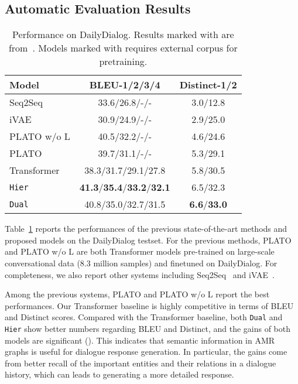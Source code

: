 \documentclass[11pt,a4paper]{article}
\begin{document}
\subsection{Automatic Evaluation Results}
\begin{table}
	\centering
	\small
	\begin{tabular}{lcc}
		\toprule
		\textbf{Model}&BLEU-1/2/3/4 &Distinct-1/2 \\
		\midrule
		Seq2Seq &33.6/26.8/-/- &3.0/12.8   \\
		iVAE &30.9/24.9/-/- &2.9/25.0  \\
		PLATO w/o L &40.5/32.2/-/- &4.6/24.6 \\
		PLATO &39.7/31.1/-/- &5.3/29.1 \\
		\midrule
		\rowcolor{mygray}
		Transformer &38.3/31.7/29.1/27.8 &5.8/30.5  \\
		\rowcolor{mygray}
        \texttt{Hier} &\textbf{41.3}/\textbf{35.4}/\textbf{33.2}/\textbf{32.1} &6.5/32.3 \\
		\rowcolor{mygray}
		\texttt{Dual} &40.8/35.0/32.7/31.5 &\textbf{6.6}/\textbf{33.0}\\
\bottomrule
	\end{tabular}
	\caption{Performance on DailyDialog. Results marked with  are from~\citet{bao-etal-2020-plato}. Models marked with  requires external corpus for pretraining.}
	\label{tab:mainDG}
\end{table}
Table~\ref{tab:mainDG} reports the performances of the previous state-of-the-art methods and proposed models on the DailyDialog testset.
For the previous methods, PLATO and PLATO w/o L are both Transformer models pre-trained on large-scale conversational data (8.3 million samples) and finetuned on DailyDialog. 
For completeness, we also report other systems including Seq2Seq~\cite{VinyalsL15} and iVAE~\cite{FangLGDC19}.


Among the previous systems, PLATO and PLATO w/o L report the best performances.
Our Transformer baseline is highly competitive in terms of BLEU and Distinct scores. Compared with the Transformer baseline, both \texttt{Dual} and
\texttt{Hier} show better numbers regarding BLEU and Distinct,
and the gains of both models are significant ().
This indicates that semantic information in AMR graphs is useful for dialogue response generation.
In particular, the gains come from better recall of the important entities and their relations in a dialogue history, which can leads to generating a more detailed response.
\end{document}
